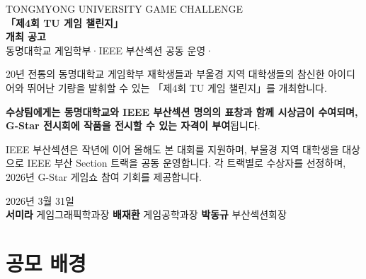 \documentclass[11pt, a4paper]{article}
\begin{document}
\color{textmain}

\begin{titlebanner}
  \begin{center}
    {\small\color{white!70} TONGMYONG UNIVERSITY GAME CHALLENGE}\\[8pt]
    {\fontsize{26pt}{32pt}\selectfont\bfseries\color{white}
      「제4회 TU 게임 챌린지」}\\[4pt]
    {\fontsize{26pt}{32pt}\selectfont\bfseries\color{gold} 개최 공고}\\[14pt]
    {\small\color{white!80}
      동명대학교 게임학부\;\;·\;\;IEEE 부산섹션 공동 운영\;\;·\;}
  \end{center}
\end{titlebanner}

\vspace{16pt}

\begin{infocard}
20년 전통의 동명대학교 게임학부 재학생들과 부울경 지역 대학생들의 참신한 아이디어와
뛰어난 기량을 발휘할 수 있는 「제4회 TU 게임 챌린지」를 개최합니다.

\textbf{\color{accent}수상팀에게는 동명대학교와 IEEE 부산섹션 명의의 표창과 함께 시상금이 수여되며,
G-Star 전시회에 작품을 전시할 수 있는 자격이 부여}됩니다.

IEEE 부산섹션은 작년에 이어 올해도 본 대회를 지원하며, 부울경 지역 대학생을 대상으로
IEEE 부산 Section 트랙을 공동 운영합니다. 각 트랙별로 수상자를 선정하며, 2026년 G-Star
게임쇼 참여 기회를 제공합니다.
\end{infocard}

\vspace{6pt}
\begin{flushright}
  \color{textmuted}\small 2026년 3월 31일\\[4pt]
  \color{textmain}
  \textbf{서미라} \;게임그래픽학과장 \qquad
  \textbf{배재환} \;게임공학과장 \qquad
  \textbf{박동규} \;부산섹션회장
\end{flushright}


\section{공모 배경}
\end{document}
